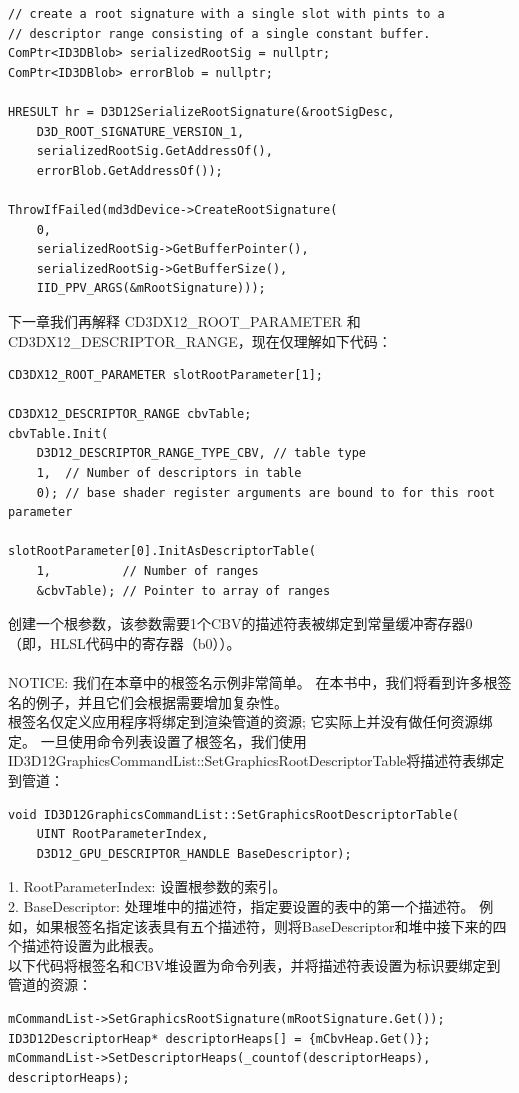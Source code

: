 \documentclass[11pt,a4paper,oldfontcommands]{memoir}
\begin{document}
{\begin{flushleft}
\begin{lstlisting}
// create a root signature with a single slot with pints to a
// descriptor range consisting of a single constant buffer.
ComPtr<ID3DBlob> serializedRootSig = nullptr;
ComPtr<ID3DBlob> errorBlob = nullptr;

HRESULT hr = D3D12SerializeRootSignature(&rootSigDesc, 
    D3D_ROOT_SIGNATURE_VERSION_1,
    serializedRootSig.GetAddressOf(),
    errorBlob.GetAddressOf());

ThrowIfFailed(md3dDevice->CreateRootSignature(
    0,
    serializedRootSig->GetBufferPointer(),
    serializedRootSig->GetBufferSize(),
    IID_PPV_ARGS(&mRootSignature)));
\end{lstlisting}
下一章我们再解释 CD3DX12\_ROOT\_PARAMETER 和 CD3DX12\_DESCRIPTOR\_RANGE，现在仅理解如下代码：\\
\begin{lstlisting}
CD3DX12_ROOT_PARAMETER slotRootParameter[1];

CD3DX12_DESCRIPTOR_RANGE cbvTable;
cbvTable.Init(
    D3D12_DESCRIPTOR_RANGE_TYPE_CBV, // table type
    1,  // Number of descriptors in table
    0); // base shader register arguments are bound to for this root parameter

slotRootParameter[0].InitAsDescriptorTable(
    1,          // Number of ranges
    &cbvTable); // Pointer to array of ranges
\end{lstlisting}
创建一个根参数，该参数需要1个CBV的描述符表被绑定到常量缓冲寄存器0（即，HLSL代码中的寄存器（b0））。\\
~\\
NOTICE: 我们在本章中的根签名示例非常简单。 在本书中，我们将看到许多根签名的例子，并且它们会根据需要增加复杂性。
~\\
根签名仅定义应用程序将绑定到渲染管道的资源; 它实际上并没有做任何资源绑定。 一旦使用命令列表设置了根签名，我们使用ID3D12GraphicsCommandList::SetGraphicsRootDescriptorTable将描述符表绑定到管道：\\
\begin{lstlisting}
void ID3D12GraphicsCommandList::SetGraphicsRootDescriptorTable(
    UINT RootParameterIndex,
    D3D12_GPU_DESCRIPTOR_HANDLE BaseDescriptor);
\end{lstlisting}
1. RootParameterIndex: 设置根参数的索引。\\
2. BaseDescriptor: 处理堆中的描述符，指定要设置的表中的第一个描述符。 例如，如果根签名指定该表具有五个描述符，则将BaseDescriptor和堆中接下来的四个描述符设置为此根表。\\
以下代码将根签名和CBV堆设置为命令列表，并将描述符表设置为标识要绑定到管道的资源：\\
\begin{lstlisting}
mCommandList->SetGraphicsRootSignature(mRootSignature.Get());
ID3D12DescriptorHeap* descriptorHeaps[] = {mCbvHeap.Get()};
mCommandList->SetDescriptorHeaps(_countof(descriptorHeaps), descriptorHeaps);


\end{lstlisting}
\end{flushleft}}
\end{document}
